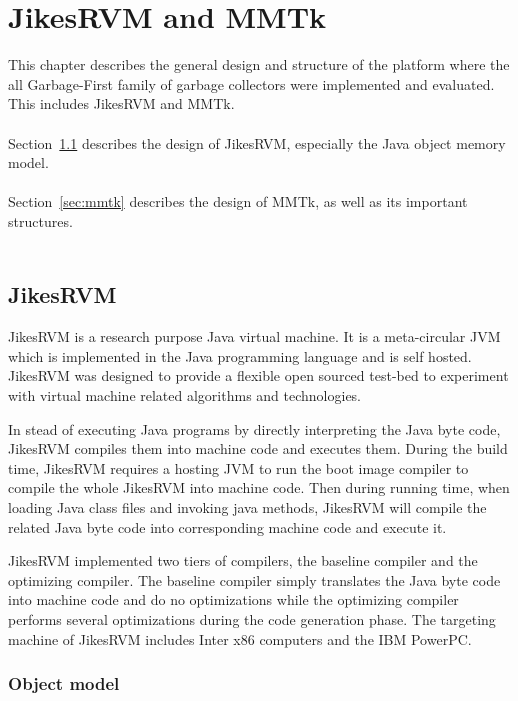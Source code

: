 \chapter{JikesRVM and MMTk}
\label{cha:platform}

This chapter describes the general design and structure of the platform where the all Garbage-First
family of garbage collectors were implemented and evaluated. This includes JikesRVM
and MMTk.
\\\\
Section~\ref{sec:jikesrvm} describes the design of JikesRVM, especially the Java object memory model.
\\\\
Section~\ref{sec:mmtk} describes the design of MMTk, as well as its important structures.
\\\\

\section{JikesRVM}
\label{sec:jikesrvm}

JikesRVM is a research purpose Java virtual machine. It is a meta-circular JVM
which is implemented in the Java programming language and is self hosted.
JikesRVM was designed to provide a flexible open sourced test-bed to
experiment with virtual machine related algorithms and technologies.

In stead of executing Java programs by directly interpreting the Java byte code,
JikesRVM compiles them into machine code and executes them.
During the build time, JikesRVM requires a hosting JVM to run the boot image compiler
to compile the whole JikesRVM into machine code.
Then during running time, when loading Java class files and invoking java methods,
JikesRVM will compile the related Java byte code into corresponding machine code and execute it.

JikesRVM implemented two tiers of compilers, the baseline compiler and the optimizing compiler.
The baseline compiler simply translates the Java byte code into machine code and do no
optimizations while the optimizing compiler performs several optimizations during the
code generation phase. The targeting machine of JikesRVM includes Inter x86 computers
and the IBM PowerPC.

\subsection{Object model}

